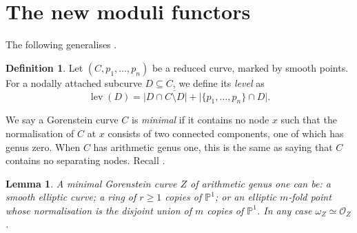 \documentclass[11pt]{amsart}
\newcommand{\PP}{\mathbb P}
\newcommand{\OO}{\mathcal O}
\renewcommand{\to}{\rightarrow}
\newcommand{\dvr}{\Delta}
\newcommand{\lev}{\operatorname{lev}}
\theoremstyle{plain}
\newtheorem{lem}[thm]{Lemma}
\theoremstyle{definition}
\newtheorem{dfn}[thm]{Definition}
\begin{document}

\section{The new moduli functors}
The following generalises \cite[Definition 3.4]{SMY1}.
\begin{dfn}
 Let $(C,p_1,\ldots,p_n)$ be a reduced curve, marked by smooth points. For a nodally attached subcurve $D\subseteq C$, we define its \emph{level} as \[ \lev(D)=\lvert D\cap\overline{C\setminus D}\rvert+\lvert\{p_1,\ldots,p_n\}\cap D\rvert.\]
\end{dfn}
We say a Gorenstein curve $C$ is \emph{minimal} if it contains no node $x$ such that the normalisation of $C$ at $x$ consists of two connected components, one of which has genus zero. When $C$ has arithmetic genus one, this is the same as saying that $C$ contains no separating nodes. Recall \cite[Lemma 3.3]{SMY1}.

\begin{lem}\label{lem:min1}
 A minimal Gorenstein curve $Z$ of arithmetic genus one can be: a smooth elliptic curve; a ring of $r\geq 1$ copies of $\PP^1$; or an elliptic $m$-fold point whose normalisation is the disjoint union of $m$ copies of $\PP^1$. In any case $\omega_Z\simeq\OO_Z$.
\end{lem}
\end{document}
